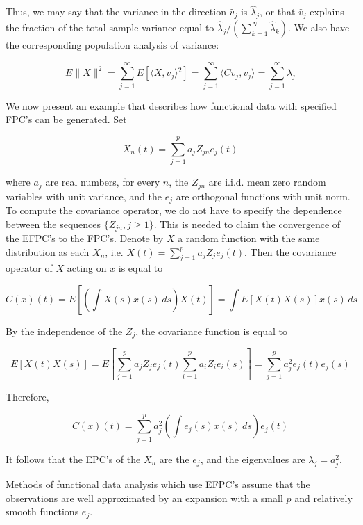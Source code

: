 Thus, we may say that the variance in the direction $\hat{v}_j$ is $\hat{\lambda}_j$, or that $\hat{v}_j$ explains the fraction of the total sample variance equal to $\hat{\lambda}_j / (\sum_{k = 1}^{N}\hat{\lambda}_k)$. We also have the corresponding population analysis of variance:

\begin{equation}
  E\|X\|^2 = \sum_{j = 1}^{\infty}E[\langle{}X, v_j\rangle{}^2] = \sum_{j = 1}^{\infty}\langle{}C v_j, v_j\rangle{} = \sum_{j = 1}^{\infty}\lambda_j
\end{equation}

We now present an example that describes how functional data with specified FPC's can be generated. Set

\begin{equation}
  X_n(t) = \sum_{j = 1}^{p}a_{j}Z_{jn}e_{j}(t)
\end{equation}

where $a_j$ are real numbers, for every $n$, the $Z_{jn}$ are i.i.d. mean zero random variables with unit variance, and the $e_j$ are orthogonal functions with unit norm. To compute the covariance operator, we do not have to specify the dependence between the sequences $\{Z_{jn}, j \geq 1\}$. This is needed to claim the convergence of the EFPC's to the FPC's. Denote by $X$ a random function with the same distribution as each $X_n$, i.e. $X(t) = \sum_{j = 1}^{p}a_{j}Z_{j}e_{j}(t)$. Then the covariance operator of $X$ acting on $x$ is equal to

\begin{equation}
  C(x)(t) = E[(\int X(s)x(s)\,ds)X(t)] = \int E[X(t)X(s)]x(s) \,ds
\end{equation}

By the independence of the $Z_j$, the covariance function is equal to

\begin{equation}
  E[X(t)X(s)] = E[\sum_{j = 1}^{p}a_{j}Z_{j}e_{j}(t)\sum_{i = 1}^{p}a_{i}Z_{i}e_{i}(s)] = \sum_{j = 1}^{p}a_{j}^{2}e_{j}(t)e_{j}(s)
\end{equation}

Therefore,

\begin{equation}
  C(x)(t) = \sum_{j = 1}^{p}a_{j}^{2}(\int e_{j}(s)x(s) \,ds)e_{j}(t)
\end{equation}

It follows that the EPC's of the $X_n$ are the $e_j$, and the eigenvalues are $\lambda_j = a_{j}^{2}$.

Methods of functional data analysis which use EFPC's assume that the observations are well approximated by an expansion with a small $p$ and relatively smooth functions $e_j$.

